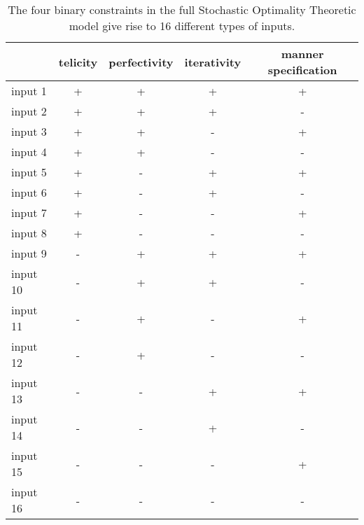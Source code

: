 \begin{table}[htb] %
\caption{The four binary constraints in the full Stochastic Optimality Theoretic model give rise to 16 different types of inputs.}
\begin{tabular}{l|cccc}
         & telicity & perfectivity & iterativity & manner specification \\
         \hline
input 1  & +       & +           & +          & +                   \\
input 2  & +       & +           & +          & -                   \\
input 3  & +       & +           & -          & +                   \\
input 4  & +       & +           & -          & -                   \\
input 5  & +       & -           & +          & +                   \\
input 6  & +       & -           & +          & -                   \\
input 7  & +       & -           & -          & +                   \\
input 8  & +       & -           & -          & -                   \\
input 9  & -       & +           & +          & +                   \\
input 10 & -       & +           & +          & -                   \\
input 11 & -       & +           & -          & +                   \\
input 12 & -       & +           & -          & -                   \\
input 13 & -       & -           & +          & +                   \\
input 14 & -       & -           & +          & -                   \\
input 15 & -       & -           & -          & +                   \\
input 16 & -       & -           & -          & -           
\end{tabular}
\end{table}

